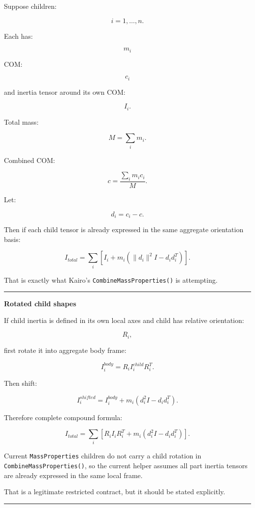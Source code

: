 Suppose children:

\[
i=1,\dots,n.
\]

Each has:

\[
m_i
\]

COM:

\[
c_i
\]

and inertia tensor around its own COM:

\[
I_i.
\]

Total mass:

\[
\boxed{
M=\sum_i m_i.
}
\]

Combined COM:

\[
\boxed{
c=
\frac{
\sum_i m_ic_i
}{
M
}.
}
\]

Let:

\[
d_i=c_i-c.
\]

Then if each child tensor is already expressed in the same aggregate orientation basis:

\[
\boxed{
I_{total}
=
\sum_i
\left[
I_i+
m_i
(
\|d_i\|^2I-d_id_i^T
)
\right].
}
\]

That is exactly what Kairo's \texttt{CombineMassProperties()} is attempting.

\begin{center}\rule{0.5\linewidth}{0.5pt}\end{center}

\textbf{Rotated child shapes}

If child inertia is defined in its own local axes and child has relative orientation:

\[
R_i,
\]

first rotate it into aggregate body frame:

\[
I_i^{body}
=
R_i
I_i^{child}
R_i^T.
\]

Then shift:

\[
I_i^{shifted}
=
I_i^{body}
+
m_i
(
d_i^2I-d_id_i^T
).
\]

Therefore complete compound formula:

\[
\boxed{
I_{total}
=
\sum_i
\left[
R_iI_iR_i^T
+
m_i
(
d_i^2I-d_id_i^T
)
\right].
}
\]

Current \texttt{MassProperties} children do not carry a child rotation in \texttt{CombineMassProperties()}, so the current helper assumes all part inertia tensors are already expressed in the same local frame.

That is a legitimate restricted contract, but it should be stated explicitly.

\begin{center}\rule{0.5\linewidth}{0.5pt}\end{center}

